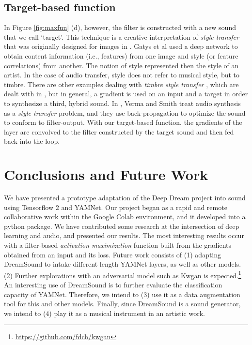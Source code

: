 \documentclass[a4paper,10pt,oneside]{article}
\begin{document}
\begin{sloppy}
\subsection{Target-based function}
In Figure \ref{fig:maxfun} (d), however, the filter is constructed with a new sound that we call `target'. This technique is a creative interpretation of \textit{style transfer} that was originally designed for images in \cite{GatysEB15a}. Gatys et al used a deep network to obtain content information (i.e., features) from one image and style (or feature correlations) from another. The notion of style represented then the style of an artist. In the case of audio transfer, style does not refer to musical style, but to timbre. There are other examples dealing with \textit{timbre style transfer} \cite{Foote2016, Ulyanov2016, Wyse2017}, which are dealt with in \cite{Briot2017}, but in general, a gradient is used on an input and a target in order to synthesize a third, hybrid sound. In \cite{verma2018neural}, Verma and Smith treat audio synthesis as a \textit{style transfer} problem, and they use back-propagation to optimize the sound to conform to filter-output. With our target-based function, the gradients of the layer are convolved to the filter constructed by the target sound and then fed back into the loop. 

\section{Conclusions and Future Work}
 
We have presented a prototype adaptation of the Deep Dream project into sound using Tensorflow 2 and YAMNet. Our project began as a rapid and remote collaborative work within the Google Colab environment, and it developed into a python package. We have contributed some research at the intersection of deep learning and audio, and presented our results. The most interesting results occur with a filter-based \textit{activation maximization} function built from the gradients obtained from an input and its loss. Future work consists of (1) adapting DreamSound to intake different length YAMNet layers, as well as other models. (2) Further explorations with an adversarial model such as Kwgan is expected.\footnote{\url{https://github.com/fdch/kwgan}} An interesting use of DreamSound is to further evaluate the classification capacity of YAMNet. Therefore, we intend to (3) use it as a data augmentation tool for this and other models. Finally, since DreamSound is a sound generator, we intend to (4) play it as a musical instrument in an artistic work.




\end{sloppy}
\end{document}
